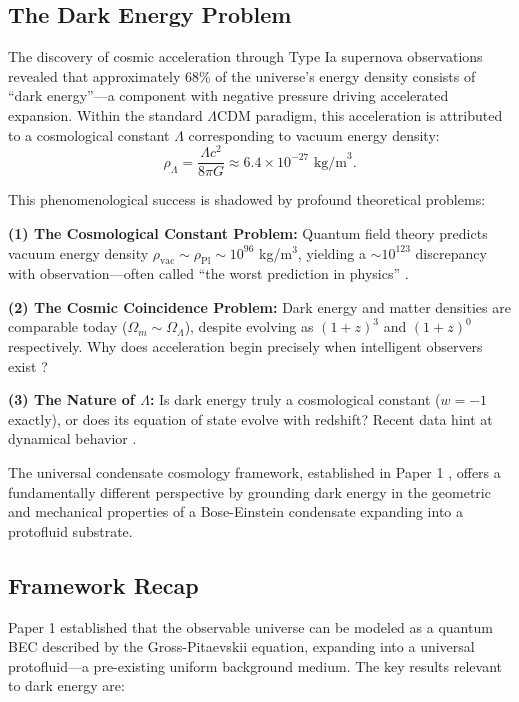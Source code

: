 \documentclass[11pt,a4paper]{article}
\newcommand{\OmegaLam}{\ensuremath{\Omega_\Lambda}}
\newcommand{\OmegaM}{\ensuremath{\Omega_m}}
\theoremstyle{definition}
\theoremstyle{remark}
\begin{document}
\subsection{The Dark Energy Problem}
\label{sec:dark_energy_problem}

The discovery of cosmic acceleration through Type Ia supernova observations \cite{Riess1998,Perlmutter1999} revealed that approximately 68\% of the universe's energy density consists of ``dark energy''---a component with negative pressure driving accelerated expansion. Within the standard $\Lambda$CDM paradigm, this acceleration is attributed to a cosmological constant $\Lambda$ corresponding to vacuum energy density:
\begin{equation}
\rho_\Lambda = \frac{\Lambda c^2}{8\pi G} \approx 6.4 \times 10^{-27} \text{ kg/m}^3.
\end{equation}

This phenomenological success is shadowed by profound theoretical problems:

\textbf{(1) The Cosmological Constant Problem:} Quantum field theory predicts vacuum energy density $\rho_{\mathrm{vac}} \sim \rho_{\mathrm{Pl}} \sim 10^{96}$ kg/m$^3$, yielding a $\sim 10^{123}$ discrepancy with observation---often called ``the worst prediction in physics'' \cite{Weinberg1989,Martin2012}.

\textbf{(2) The Cosmic Coincidence Problem:} Dark energy and matter densities are comparable today ($\OmegaM \sim \OmegaLam$), despite evolving as $(1+z)^3$ and $(1+z)^0$ respectively. Why does acceleration begin precisely when intelligent observers exist \cite{Padmanabhan2003}?

\textbf{(3) The Nature of $\Lambda$:} Is dark energy truly a cosmological constant ($w = -1$ exactly), or does its equation of state evolve with redshift? Recent data hint at dynamical behavior \cite{DESI2024}.

The universal condensate cosmology framework, established in Paper 1 \cite{SkavbergPaper1}, offers a fundamentally different perspective by grounding dark energy in the geometric and mechanical properties of a Bose-Einstein condensate expanding into a protofluid substrate.

\subsection{Framework Recap}
\label{sec:framework_recap}

Paper 1 established that the observable universe can be modeled as a quantum BEC described by the Gross-Pitaevskii equation, expanding into a universal protofluid---a pre-existing uniform background medium. The key results relevant to dark energy are:
\end{document}
